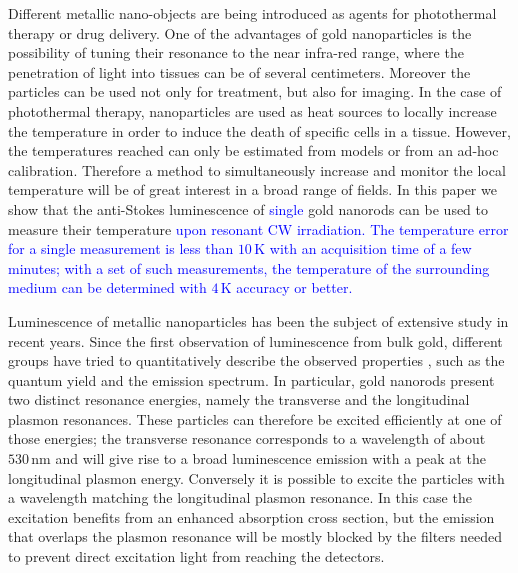 \documentclass[journal=nalefd,manuscript=letter]{achemso}
\newcommand{\HI}[1]{\textcolor{blue}{#1}} %
\newcommand{\K}{\ensuremath{\,\textrm{K}}}
\newcommand{\nm}{\ensuremath{\,\textrm{nm}}}
\begin{document}
Different metallic nano-objects are being introduced as agents for photothermal
therapy\cite{Huang2006,Huang2008} or drug delivery\cite{Kang2013}. One of the
advantages of gold nanoparticles is the possibility of tuning their resonance to
the near infra-red range, where the penetration of light into tissues can be of
several
centimeters\cite{Huang2006,Gobin2007,Hirsch2003,ONeal2004,Li2013c,Huang2008}.
Moreover the particles can be used not only for treatment, but also for
imaging\cite{Zhao2014a,Huang2006}. In the case of photothermal therapy,
nanoparticles are used as heat sources\cite{Gobin2007,Hirsch2003} to locally
increase the temperature in order to induce the death of specific cells in a
tissue\cite{Huang2008,Huang2006}. However, the temperatures
reached\cite{Donner2013} can only be estimated from models\cite{Zhao2014a} or
from an ad-hoc calibration. Therefore a method to simultaneously increase 
and monitor the local temperature will be of great interest in a
broad range of fields. In this paper we show that the anti-Stokes luminescence
of \HI{single} gold nanorods can be used to measure their temperature 
\HI{upon resonant CW irradiation. The temperature error for a single measurement
is less than $10\K$ with an acquisition time of a few minutes; with a set of such 
measurements, the temperature of the surrounding medium can be determined with 
$4\K$ accuracy or better.}

Luminescence of metallic nanoparticles has been the subject of extensive study in
recent years. Since the first observation of luminescence from bulk
gold\cite{Mooradian1969}, different groups have tried to quantitatively describe
the observed properties\cite{Mohamed2000,Beversluis2003a} \HI{\cite{Huang2014, hugall2015demonstrating,mertens2017light}}, 
such as the quantum yield\cite{Fang2012,Rao2015,Yorulmaz2012,Cheng2015,Dulkeith2004} and the
emission spectrum\cite{Link2010}. In particular, gold nanorods present two distinct
resonance energies, namely the transverse and the longitudinal plasmon
resonances. These particles can therefore be excited efficiently at one of those
energies; the transverse resonance corresponds to a wavelength of about $530\nm$ and will give
rise to a broad luminescence emission with a peak at the longitudinal plasmon energy.
Conversely it is possible to excite the particles with a wavelength matching
the longitudinal plasmon resonance. In this case the excitation benefits from
an enhanced absorption cross section, but the emission that overlaps the plasmon
resonance will be mostly blocked by the filters needed to prevent direct
excitation light from reaching the detectors.
\end{document}
